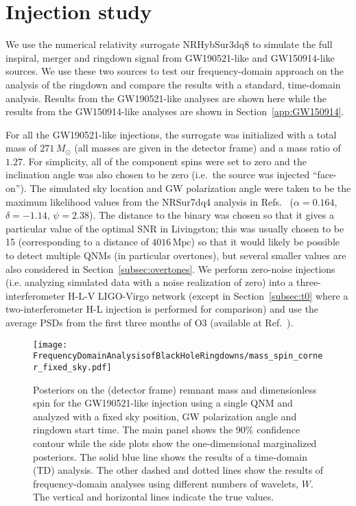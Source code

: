 \section{Injection study}\label{sec:injection_study}

We use the numerical relativity surrogate NRHybSur3dq8 \cite{Varma:2018mmi} to simulate the full inspiral, merger and ringdown signal from GW190521-like and GW150914-like sources. 
We use these two sources to test our frequency-domain approach on the analysis of the ringdown and compare the results with a standard, time-domain analysis.
Results from the GW190521-like analyses are shown here while the results from the GW150914-like analyses are shown in Section~\ref{app:GW150914}.

For all the GW190521-like injections, the surrogate was initialized with a total mass of $271\,M_\odot$ (all masses are given in the detector frame) and a mass ratio of $1.27$. 
For simplicity, all of the component spins were set to zero and the inclination angle was also chosen to be zero (i.e.\ the source was injected ``face-on'').
The simulated sky location and GW polarization angle were taken to be the maximum likelihood values from the NRSur7dq4 analysis in Refs.~\cite{LIGOScientific:2020ibl, gwtc2datarelease} ($\alpha = 0.164$, $\delta = -1.14$, $\psi = 2.38$).
The distance to the binary was chosen so that it gives a particular value of the optimal SNR in Livingston; this was usually chosen to be 15 (corresponding to a distance of $4016\,\mathrm{Mpc}$) so that it would likely be possible to detect multiple QNMs (in particular overtones), but several smaller values are also considered in Section~\ref{subsec:overtones}.
We perform zero-noise injections (i.e. analyzing simulated data with a noise realization of zero) into a three-interferometer H-L-V LIGO-Virgo network (except in Section~\ref{subsec:t0} where a two-interferometer H-L injection is performed for comparison) and use the average PSDs from the first three months of O3 (available at Ref.~\cite{o3psd}).

\begin{figure}[t!]
    \centering
    \texttt{[image: FrequencyDomainAnalysisofBlackHoleRingdowns/mass\_spin\_corner\_fixed\_sky.pdf]}
    \caption[Posteriors on the remnant mass and spin for a GW190521-like injection analyzed with a fixed sky position, GW polarization angle and ringdown start time]{ 
    Posteriors on the (detector frame) remnant mass and dimensionless spin for the GW190521-like injection using a single QNM and analyzed with a fixed sky position, GW polarization angle and ringdown start time.
    The main panel shows the $90\%$ confidence contour while the side plots show the one-dimensional marginalized posteriors.
    The solid blue line shows the results of a time-domain (TD) analysis.
    The other dashed and dotted lines show the results of frequency-domain analyses using different numbers of wavelets, $W$.
    The vertical and horizontal lines indicate the true values.
    }
    \label{fig:mass_spin_corner_fixed_sky}
\end{figure}

